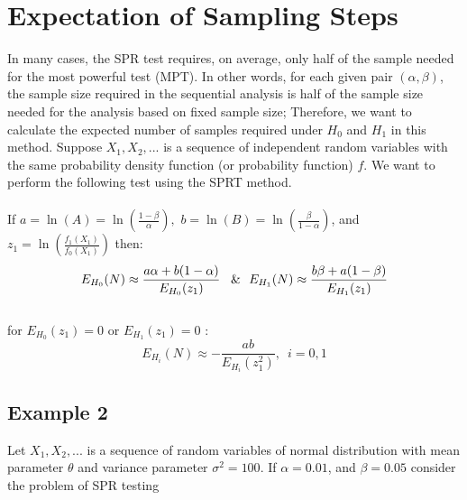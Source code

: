 \documentclass{article}
\begin{document}
\section{Expectation of Sampling Steps}
In many cases, the SPR test requires, on average, only half of the sample needed for the most powerful test (MPT). In other words, for each given pair $(\alpha, \beta)$, the sample size required in the sequential analysis is half of the sample size needed for the analysis based on fixed sample size; Therefore, we want to calculate the expected number of samples required under $H_0$ and $H_1$ in this method.
Suppose $X_1,X_2,...$ is a sequence of independent random variables with the same probability density function (or probability function) $f$. We want to perform the following test using the SPRT method.\\\\
If $a = \ln (A) = \ln (\frac{{1 - \beta }}{\alpha }),\,\,b = \ln (B) = \ln (\frac{\beta }{{1 - \alpha }})$, and ${z_1} = \ln (\frac{{{f_1}({X_1})}}{{{f_0}({X_1})}})$ then:
\[{E_{{H_0}}}(N) \approx \frac{{a\alpha  + b(1 - \alpha )}}{{{E_{{H_0}}}({z_1})}}\,\,\,\,\,{\rm{\& }}\,\,\,\,{E_{{H_1}}}(N) \approx \frac{{b\beta  + a(1 - \beta )}}{{{E_{{H_1}}}({z_1})}}\]
\\for ${{E_{{H_0}}}({z_1}) = 0}$ or ${{E_{{H_1}}}({z_1}) = 0}$ :
\[{E_{{H_i}}}(N) \approx  - \frac{{ab}}{{{E_{{H_i}}}(z_1^2)}},\,\,\,i = 0,1\]
\subsection{Example 2}
Let $X_1,X_2,...$ is a sequence of random variables of normal distribution with mean parameter $\theta$ and variance parameter ${\sigma ^2} = 100$. If $\alpha=0.01$, and $\beta=0.05$ consider the problem of SPR testing 
\end{document}
